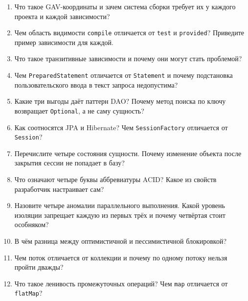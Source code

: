\begin{enumerate}
\item Что такое GAV-координаты и зачем система сборки требует их у каждого
      проекта и каждой зависимости?
\item Чем область видимости \texttt{compile} отличается от \texttt{test} и
      \texttt{provided}? Приведите пример зависимости для каждой.
\item Что такое транзитивные зависимости и почему они могут стать проблемой?
\item Чем \texttt{PreparedStatement} отличается от \texttt{Statement} и
      почему подстановка пользовательского ввода в текст запроса недопустима?
\item Какие три выгоды даёт паттерн DAO? Почему метод поиска по ключу
      возвращает \texttt{Optional}, а не саму сущность?
\item Как соотносятся JPA и Hibernate? Чем \texttt{SessionFactory} отличается
      от \texttt{Session}?
\item Перечислите четыре состояния сущности. Почему изменение объекта после
      закрытия сессии не попадает в базу?
\item Что означают четыре буквы аббревиатуры ACID? Какое из свойств
      разработчик настраивает сам?
\item Назовите четыре аномалии параллельного выполнения. Какой уровень
      изоляции запрещает каждую из первых трёх и почему четвёртая стоит
      особняком?
\item В чём разница между оптимистичной и пессимистичной блокировкой?
\item Чем поток отличается от коллекции и почему по одному потоку нельзя
      пройти дважды?
\item Что такое ленивость промежуточных операций? Чем \texttt{map} отличается
      от \texttt{flatMap}?
\end{enumerate}

\testzadaniya

